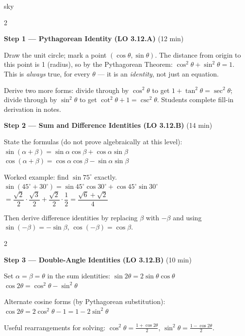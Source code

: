 \documentclass[10pt]{article}
\begin{document}
\begin{skillbox}{sky}
\begin{multicols}{2}

\textbf{Step 1 --- Pythagorean Identity (LO 3.12.A)} (12 min)

Draw the unit circle; mark a point $(\cos\theta, \sin\theta)$.
The distance from origin to this point is 1 (radius), so by the
Pythagorean Theorem: $\cos^2\theta + \sin^2\theta = 1$.
This is \emph{always} true, for every $\theta$ --- it is an \emph{identity},
not just an equation.

Derive two more forms: divide through by $\cos^2\theta$ to get
$1 + \tan^2\theta = \sec^2\theta$; divide through by $\sin^2\theta$ to get
$\cot^2\theta + 1 = \csc^2\theta$. Students complete fill-in derivation in notes.

\columnbreak

\textbf{Step 2 --- Sum and Difference Identities (LO 3.12.B)} (14 min)

State the formulas (do not prove algebraically at this level):
$\sin(\alpha+\beta) = \sin\alpha\cos\beta + \cos\alpha\sin\beta$
$\cos(\alpha+\beta) = \cos\alpha\cos\beta - \sin\alpha\sin\beta$

Worked example: find $\sin 75^\circ$ exactly.
$\sin(45^\circ+30^\circ)=\sin 45^\circ\cos 30^\circ + \cos 45^\circ\sin 30^\circ$
$=\dfrac{\sqrt{2}}{2}\cdot\dfrac{\sqrt{3}}{2}+\dfrac{\sqrt{2}}{2}\cdot\dfrac{1}{2}
=\dfrac{\sqrt{6}+\sqrt{2}}{4}$

Then derive difference identities by replacing $\beta$ with $-\beta$ and
using $\sin(-\beta)=-\sin\beta$, $\cos(-\beta)=\cos\beta$.

\end{multicols}

\begin{multicols}{2}

\textbf{Step 3 --- Double-Angle Identities (LO 3.12.B)} (10 min)

Set $\alpha = \beta = \theta$ in the sum identities:
$\sin 2\theta = 2\sin\theta\cos\theta$
$\cos 2\theta = \cos^2\theta - \sin^2\theta$

Alternate cosine forms (by Pythagorean substitution):
$\cos 2\theta = 2\cos^2\theta - 1 = 1 - 2\sin^2\theta$

Useful rearrangements for solving: $\cos^2\theta = \frac{1+\cos 2\theta}{2}$,
$\sin^2\theta = \frac{1 - \cos 2\theta}{2}$.


\end{multicols}
\end{skillbox}
\end{document}
